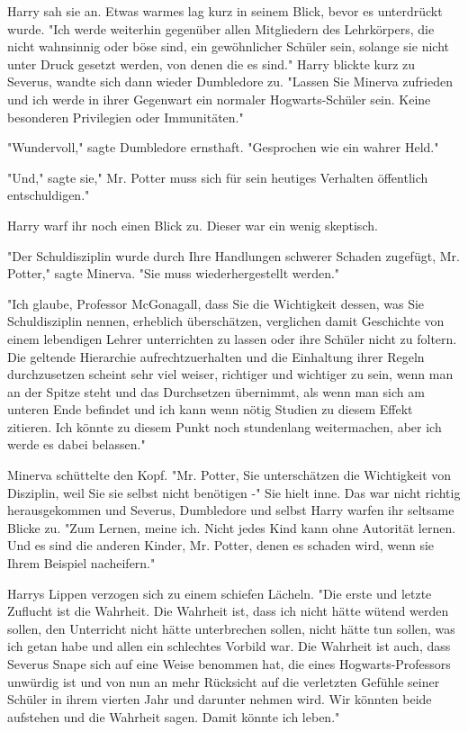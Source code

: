{Harry sah sie an. Etwas warmes lag kurz in seinem Blick, bevor es unterdrückt wurde. "Ich werde weiterhin gegenüber allen Mitgliedern des Lehrkörpers, die nicht wahnsinnig oder böse sind, ein gewöhnlicher Schüler sein, solange sie nicht unter Druck gesetzt werden, von denen die es sind." Harry blickte kurz zu Severus, wandte sich dann wieder Dumbledore zu. "Lassen Sie Minerva zufrieden und ich werde in ihrer Gegenwart ein normaler Hogwarts-Schüler sein. Keine besonderen Privilegien oder Immunitäten."

"Wundervoll," sagte Dumbledore ernsthaft. "Gesprochen wie ein wahrer Held."

"Und," sagte sie," Mr. Potter muss sich für sein heutiges Verhalten öffentlich entschuldigen."

Harry warf ihr noch einen Blick zu. Dieser war ein wenig skeptisch.

"Der Schuldisziplin wurde durch Ihre Handlungen schwerer Schaden zugefügt, Mr. Potter," sagte Minerva. "Sie muss wiederhergestellt werden."

"Ich glaube, Professor McGonagall, dass Sie die Wichtigkeit dessen, was Sie Schuldisziplin nennen, erheblich überschätzen, verglichen damit Geschichte von einem lebendigen Lehrer unterrichten zu lassen oder ihre Schüler nicht zu foltern. Die geltende Hierarchie aufrechtzuerhalten und die Einhaltung ihrer Regeln durchzusetzen scheint sehr viel weiser, richtiger und wichtiger zu sein, wenn man an der Spitze steht und das Durchsetzen übernimmt, als wenn man sich am unteren Ende befindet und ich kann wenn nötig Studien zu diesem Effekt zitieren. Ich könnte zu diesem Punkt noch stundenlang weitermachen, aber ich werde es dabei belassen."

Minerva schüttelte den Kopf. "Mr. Potter, Sie unterschätzen die Wichtigkeit von Disziplin, weil Sie sie selbst nicht benötigen -" Sie hielt inne. Das war nicht richtig herausgekommen und Severus, Dumbledore und selbst Harry warfen ihr seltsame Blicke zu. "Zum Lernen, meine ich. Nicht jedes Kind kann ohne Autorität lernen. Und es sind die anderen Kinder, Mr. Potter, denen es schaden wird, wenn sie Ihrem Beispiel nacheifern."

Harrys Lippen verzogen sich zu einem schiefen Lächeln. "Die erste und letzte Zuflucht ist die Wahrheit. Die Wahrheit ist, dass ich nicht hätte wütend werden sollen, den Unterricht nicht hätte unterbrechen sollen, nicht hätte tun sollen, was ich getan habe und allen ein schlechtes Vorbild war. Die Wahrheit ist auch, dass Severus Snape sich auf eine Weise benommen hat, die eines Hogwarts-Professors unwürdig ist und von nun an mehr Rücksicht auf die verletzten Gefühle seiner Schüler in ihrem vierten Jahr und darunter nehmen wird. Wir könnten beide aufstehen und die Wahrheit sagen. Damit könnte ich leben."

}
